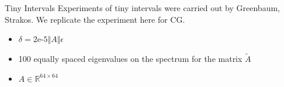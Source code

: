 \documentclass{beamer}
\begin{document}
    \begin{frame}{Tiny Intervals}
        Experiments of tiny intervals were carried out by Greenbaum, Strakos\cite{paper:greenbaum_tiny_interval_experiments}. We replicate the experiment here for CG. 
        \begin{itemize}
            \item $\delta = \text{2e-5}\Vert A\Vert \epsilon$ 
            \item 100 equally spaced eigenvalues on the spectrum for the matrix $\tilde A$
            \item $A\in \mathbb R^{64\times 64}$
        \end{itemize}
    \end{frame}
\end{document}
